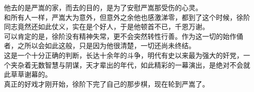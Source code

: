 \begin{multicols}{\theparacolNo}
他去的是严嵩的家，而去的目的，是为了安慰严嵩那受伤的心灵。\\

和所有人一样，严嵩大为意外，但意外之余他也感激涕零，都到了这个时候，徐阶同志竟然还如此仗义，实在是个好人，于是他顿首不已，千恩万谢。\\

可以肯定的是，徐阶没有精神失常，更不会突然转性行善。作为这一切的始作俑者，之所以会如此这般，只是因为他很清楚，一切还尚未终结。\\

这是一个十分正确的判断，长达十余年的斗争，明代有史以来最为强大的奸党，一个夹杂着无数智慧与阴谋，天才辈出的年代，如此精彩的一幕演出，是绝对不会就此草草谢幕的。\\

真正的好戏才刚开始，徐阶下完了自己的那步棋，现在轮到严嵩了。\\
\ifnum{}
	\end{multicols}
\fi
